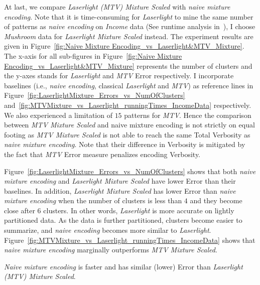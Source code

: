 At last, we compare \emph{Laserlight (MTV) Mixture Scaled} with \emph{naive mixture encoding}.
Note that it is time-consuming for \emph{Laserlight} to mine the same number of patterns as \emph{naive encoding} on \emph{Income} data (See runtime analysis in~\cite{DBLP:journals/corr/abs-1809-00405}), I choose \emph{Mushroom} data for \emph{Laserlight Mixture Scaled} instead.
The experiment results are given in Figure~\ref{fig:Naive Mixture Encoding_vs_Laserlight&MTV_Mixture}. 
The x-axis for all sub-figures in Figure~\ref{fig:Naive Mixture Encoding_vs_Laserlight&MTV_Mixture} represents the number of clusters and the y-axes stands for \emph{Laserlight} and \emph{MTV} Error respectively.
I incorporate baselines (i.e., \emph{naive encoding}, classical \emph{Laserlight} and \emph{MTV}) as reference lines in Figure~\ref{fig:LaserlightMixture_Errors_vs_NumOfClusters} and~\ref{fig:MTVMixture_vs_Laserlight_runningTimes_IncomeData} respectively.
We also experienced a limitation of $15$ patterns for \emph{MTV}.
Hence the comparison between \emph{MTV Mixture Scaled} and {naive mixture encoding} is not strictly on equal footing as \emph{MTV Mixture Scaled} is not able to reach the same Total Verbosity as \emph{naive mixture encoding}.
Note that their difference in Verbosity is mitigated by the fact that \emph{MTV} Error measure penalizes encoding Verbosity.

Figure~\ref{fig:LaserlightMixture_Errors_vs_NumOfClusters} shows that both \emph{naive mixture encoding} and \emph{Laserlight Mixture Scaled} have lower Error than their baselines.
In addition, \emph{Laserlight Mixture Scaled} has lower Error than \emph{naive mixture encoding} when the number of clusters is less than $4$ and they become close after $6$ clusters.
In other words, \emph{Laserlight} is more accurate on lightly partitioned data. 
As the data is further partitioned, clusters become easier to summarize, and \emph{naive encoding} becomes more similar to \emph{Laserlight}.
Figure~\ref{fig:MTVMixture_vs_Laserlight_runningTimes_IncomeData} shows that \emph{naive mixture encoding} marginally outperforms \emph{MTV Mixture Scaled}.

\emph{Naive mixture encoding} is faster and has similar (lower) Error than \emph{Laserlight (MTV) Mixture Scaled}.
